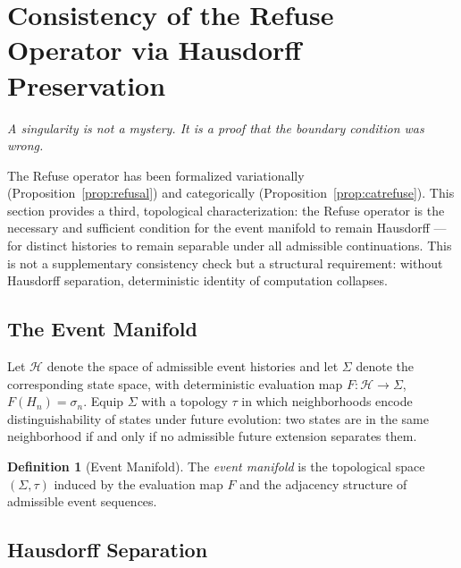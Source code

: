 \documentclass[12pt, twoside]{article}
\theoremstyle{plain}
\theoremstyle{definition}
\newtheorem{definition}[theorem]{Definition}
\theoremstyle{remark}
\begin{document}
\newpage

\section{Consistency of the Refuse Operator via Hausdorff Preservation}

\epigraph{\itshape
  A singularity is not a mystery. It is a proof that the boundary
  condition was wrong.}{}

The Refuse operator has been formalized variationally
(Proposition~\ref{prop:refusal}) and categorically
(Proposition~\ref{prop:catrefuse}).
This section provides a third, topological characterization:
the Refuse operator is the necessary and sufficient condition
for the event manifold to remain Hausdorff — for distinct
histories to remain separable under all admissible continuations.
This is not a supplementary consistency check but a structural
requirement: without Hausdorff separation, deterministic identity
of computation collapses.

\subsection{The Event Manifold}

Let $\mathcal{H}$ denote the space of admissible event histories
and let $\Sigma$ denote the corresponding state space, with
deterministic evaluation map $F: \mathcal{H} \to \Sigma$,
$F(H_n) = \sigma_n$.
Equip $\Sigma$ with a topology $\tau$ in which neighborhoods
encode distinguishability of states under future evolution:
two states are in the same neighborhood if and only if
no admissible future extension separates them.

\begin{definition}[Event Manifold]
The \emph{event manifold} is the topological space $(\Sigma, \tau)$
induced by the evaluation map $F$ and the adjacency structure
of admissible event sequences.
\end{definition}

\subsection{Hausdorff Separation}
\end{document}
